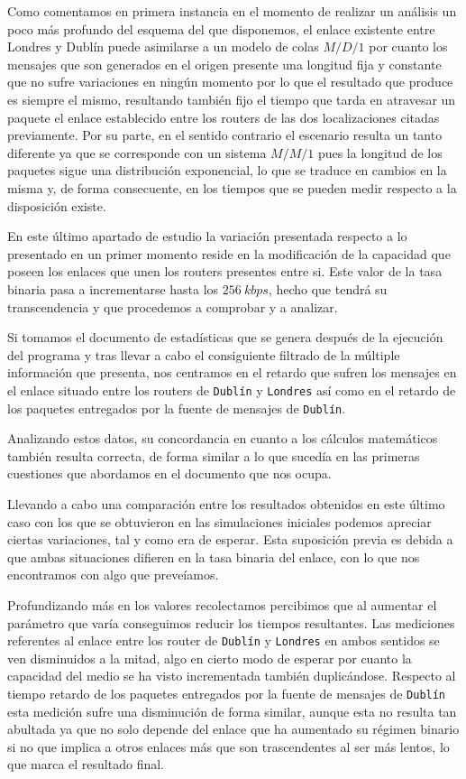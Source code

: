 \documentclass{article}[10pt]
\begin{document}
		Como comentamos en primera instancia en el momento de realizar un análisis un poco más profundo del esquema del que disponemos, el enlace existente entre Londres y Dublín puede asimilarse a un modelo de colas $M/D/1$ por cuanto los mensajes que son generados en el origen presente una longitud fija y constante que no sufre variaciones en ningún momento por lo que el resultado que produce es siempre el mismo, resultando también fijo el tiempo que tarda en atravesar un paquete el enlace establecido entre los routers de las dos localizaciones citadas previamente. Por su parte, en el sentido contrario el escenario resulta un tanto diferente ya que se corresponde con un sistema $M/M/1$ pues la longitud de los paquetes sigue una distribución exponencial, lo que se traduce en cambios en la misma y, de forma consecuente, en los tiempos que se pueden medir respecto a la disposición existe.

		En este último apartado de estudio la variación presentada respecto a lo presentado en un primer momento reside en la modificación de la capacidad que poseen los enlaces que unen los routers presentes entre si. Este valor de la tasa binaria pasa a incrementarse hasta los $256\ kbps$, hecho que tendrá su transcendencia y que procedemos a comprobar y a analizar.

		Si tomamos el documento de estadísticas que se genera después de la ejecución del programa y tras llevar a cabo el consiguiente filtrado de la múltiple información que presenta, nos centramos en el retardo que sufren los mensajes en el enlace situado entre los routers de \texttt{Dublín} y \texttt{Londres} así como en el retardo de los paquetes entregados por la fuente de mensajes de \texttt{Dublín}.

		Analizando estos datos, su concordancia en cuanto a los cálculos matemáticos también resulta correcta, de forma similar a lo que sucedía en las primeras cuestiones que abordamos en el documento que nos ocupa.

		Llevando a cabo una comparación entre los resultados obtenidos en este último caso con los que se obtuvieron en las simulaciones iniciales podemos apreciar ciertas variaciones, tal y como era de esperar. Esta suposición previa es debida a que ambas situaciones difieren en la tasa binaria del enlace, con lo que nos encontramos con algo que preveíamos.

		Profundizando más en los valores recolectamos percibimos que al aumentar el parámetro que varía conseguimos reducir los tiempos resultantes. Las mediciones referentes al enlace entre los router de \texttt{Dublín} y \texttt{Londres} en ambos sentidos se ven disminuidos a la mitad, algo en cierto modo de esperar por cuanto la capacidad del medio se ha visto incrementada también duplicándose. Respecto al tiempo retardo de los paquetes entregados por la fuente de mensajes de \texttt{Dublín} esta medición sufre una disminución de forma similar, aunque esta no resulta tan abultada ya que no solo depende del enlace que ha aumentado su régimen binario si no que implica a otros enlaces más que son trascendentes al ser más lentos, lo que marca el resultado final.
\end{document}
